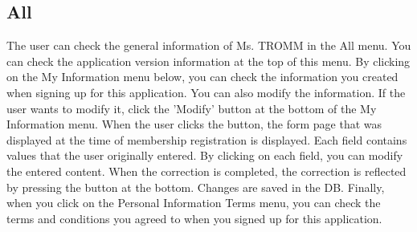 \documentclass[conference]{IEEEtran}
\begin{document}
\subsection{All}
The user can check the general information of Ms. TROMM in the All menu. You can check the application version information at the top of this menu. By clicking on the My Information menu below, you can check the information you created when signing up for this application. You can also modify the information. If the user wants to modify it, click the 'Modify' button at the bottom of the My Information menu. When the user clicks the button, the form page that was displayed at the time of membership registration is displayed. Each field contains values that the user originally entered. By clicking on each field, you can modify the entered content. When the correction is completed, the correction is reflected by pressing the button at the bottom. Changes are saved in the DB. Finally, when you click on the Personal Information Terms menu, you can check the terms and conditions you agreed to when you signed up for this application. \\




\end{document}
